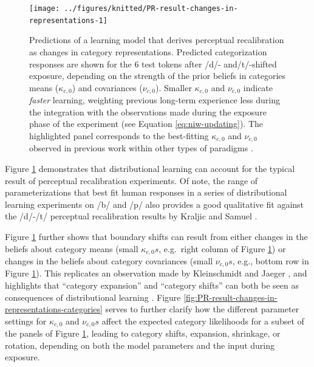 \documentclass[
  11pt,
  man,floatsintext]{apa6}
\begin{document}
\begin{figure}

{\centering \texttt{[image: ../figures/knitted/PR-result-changes-in-representations-1]} 

}

\caption{Predictions of a learning model that derives perceptual recalibration as changes in category representations. Predicted categorization responses are shown for the 6 test tokens after /d/- and/t/-shifted exposure, depending on the strength of the prior beliefs in categories means (\(\kappa_{c,0}\)) and covariances (\(\nu_{c,0}\)). Smaller \(\kappa_{c,0}\) and \(\nu_{c,0}\) indicate \emph{faster} learning, weighting previous long-term experience less during the integration with the observations made during the exposure phase of the experiment (see Equation \eqref{eq:niw-updating}). The highlighted panel corresponds to the best-fitting \(\kappa_{c,0}\) and \(\nu_{c,0}\) observed in previous work within other types of paradigms \autocite{kleinschmidt-jaeger2016cogsci,kleinschmidt2020}.}\label{fig:PR-result-changes-in-representations}
\end{figure}

Figure \ref{fig:PR-result-changes-in-representations} demonstrates that distributional learning can account for the typical result of perceptual recalibration experiments. Of note, the range of parameterizations that best fit human responses in a series of distributional learning experiments on /b/ and /p/ \autocite[gray panel in Figure \ref{fig:PR-result-changes-in-representations}, \(\kappa_{/b/,0}=\kappa_{/p/,0}=160\) (95\% CI: 75-780) and \(\nu_{/b/,0}=\nu_{/p/,0}=510\) (95\% CI: 160-1000),][]{kleinschmidt2020} also provides a good qualitative fit against the /d/-/t/ perceptual recalibration results by Kraljic and Samuel \autocite*{kraljic-samuel2007}.

Figure \ref{fig:PR-result-changes-in-representations} further shows that boundary shifts can result from either changes in the beliefs about category means (small \(\kappa_{c,0}s\), e.g.~right column of Figure \ref{fig:PR-result-changes-in-representations}) or changes in the beliefs about category covariances (small \(\nu_{c,0}s\), e.g., bottom row in Figure \ref{fig:PR-result-changes-in-representations}). This replicates an observation made by Kleinschmidt and Jaeger \autocites*[p.~168]{kleinschmidt-jaeger2015}[see also][]{hitczenko-feldman2016,theodore-monto2019}, and highlights that ``category expansion'' and ``category shifts'' can both be seen as consequences of distributional learning \autocites[see also][]{bent-baeseberk2021,schertz-clare2020}. Figure \ref{fig:PR-result-changes-in-representations-categories} serves to further clarify how the different parameter settings for \(\kappa_{c,0}\) and \(\nu_{c,0}s\) affect the expected category likelihoods for a subset of the panels of Figure \ref{fig:PR-result-changes-in-representations}, leading to category shifts, expansion, shrinkage, or rotation, depending on both the model parameters and the input during exposure.
\end{document}
